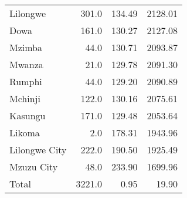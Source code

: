 \begin{tabular}{lrrr}
Lilongwe      &   301.0 &         134.49 &             2128.01 \\
Dowa          &   161.0 &         130.27 &             2127.08 \\
Mzimba        &    44.0 &         130.71 &             2093.87 \\
Mwanza        &    21.0 &         129.78 &             2091.30 \\
Rumphi        &    44.0 &         129.20 &             2090.89 \\
Mchinji       &   122.0 &         130.16 &             2075.61 \\
Kasungu       &   171.0 &         129.48 &             2053.64 \\
Likoma        &     2.0 &         178.31 &             1943.96 \\
Lilongwe City &   222.0 &         190.50 &             1925.49 \\
Mzuzu City    &    48.0 &         233.90 &             1699.96 \\
Total         &  3221.0 &           0.95 &               19.90 \\
\bottomrule
\end{tabular}
